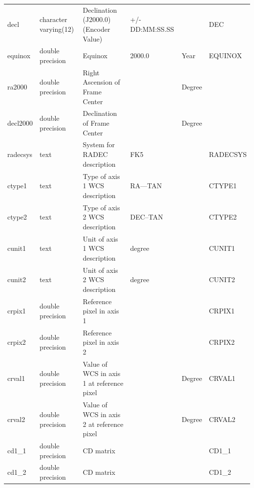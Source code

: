 \documentclass[12pt]{article}
\begin{document}
\begin{table}[thbp]
\begin{center}
{\begin{tabular}{llllll}
decl & character varying(12) & Declination (J2000.0) (Encoder Value)                    & +/-DD:MM:SS.SS            &                  & DEC         \\
equinox & double precision & Equinox                                                  & 2000.0                    & Year             & EQUINOX     \\
ra2000 & double precision & Right Ascension of Frame Center                          &                           & Degree           &             \\
decl2000 & double precision & Declination of Frame Center                              &                           & Degree           &             \\
radecsys & text & System for RADEC description                             & FK5                       &                  & RADECSYS    \\
ctype1 & text & Type of axis 1 WCS description                           & RA---TAN                  &                  & CTYPE1      \\
ctype2 & text & Type of axis 2 WCS description                           & DEC--TAN                  &                  & CTYPE2      \\
cunit1 & text & Unit of axis 1 WCS description                           & degree                    &                  & CUNIT1      \\
cunit2 & text & Unit of axis 2 WCS description                           & degree                    &                  & CUNIT2      \\
crpix1 & double precision & Reference pixel in axis 1                                &                           &                  & CRPIX1      \\
crpix2 & double precision & Reference pixel in axis 2                                &                           &                  & CRPIX2      \\
crval1 & double precision & Value of WCS in axis 1 at reference pixel                &                           & Degree           & CRVAL1      \\
crval2 & double precision & Value of WCS in axis 2 at reference pixel                &                           & Degree           & CRVAL2      \\
cd1\_1 & double precision & CD matrix                                                &                           &                  & CD1\_1       \\
cd1\_2 & double precision & CD matrix                                                &                           &                  & CD1\_2       \\

\end{tabular}}
\end{center}
\end{table}
\end{document}
